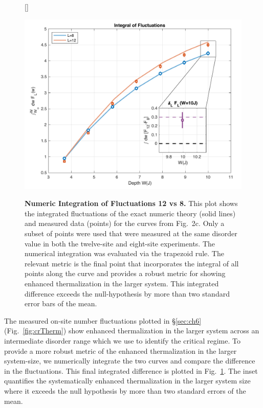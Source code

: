 \begin{figure}
[\FBwidth]
	{\caption{\textbf{Numeric Integration of Fluctuations 12 vs 8.} This plot shows the integrated fluctuations of the exact numeric theory (solid lines) and measured data (points) for the curves from Fig.~2c. Only a subset of points were used that were measured at the same disorder value in both the twelve-site and eight-site experiments. The numerical integration was evaluated via the trapezoid rule. The relevant metric is the final point that incorporates the integral of all points along the curve and provides a robust metric for showing enhanced thermalization in the larger system. This integrated difference exceeds the null-hypothesis by more than two standard error bars of the mean.
	}
	\label{fig:TrapzInt}}
{\includegraphics[width=4 in]{figures/ch6/figS5/IntegralPlotv2.pdf}} 
\end{figure}

The measured on-site number fluctuations plotted in \S \ref{sec:ch6} (Fig.~\ref{fig:crTherm}) show enhanced thermalization in the larger system across an intermediate disorder range which we use to identify the critical regime. To provide a more robust metric of the enhanced thermalization in the larger system-size, we numerically integrate the two curves and compare the difference in the fluctuations. This final integrated difference is plotted in Fig.~\ref{fig:TrapzInt}. The inset quantifies the systematically enhanced thermalization in the larger system size where it exceeds the null hypothesis by more than two standard errors of the mean.

